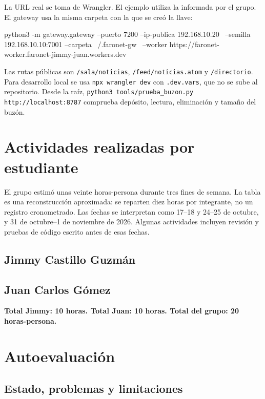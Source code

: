 \documentclass[11pt,letterpaper]{article}
\begin{document}
La URL real se toma de Wrangler. El ejemplo utiliza la informada por el grupo.
El gateway usa la misma carpeta con la que se creó la llave:

\begin{codigo}
python3 -m gateway.gateway --puerto 7200 --ip-publica 192.168.10.20 \
  --semilla 192.168.10.10:7001 --carpeta ~/.faronet-gw \
  --worker https://faronet-worker.faronet-jimmy-juan.workers.dev
\end{codigo}

Las rutas públicas son \texttt{/sala/noticias}, \texttt{/feed/noticias.atom}
y \texttt{/directorio}. Para desarrollo local se usa \texttt{npx wrangler dev}
con \texttt{.dev.vars}, que no se sube al repositorio. Desde la raíz,
\texttt{python3 tools/prueba\_buzon.py http://localhost:8787} comprueba depósito,
lectura, eliminación y tamaño del buzón.

\section{Actividades realizadas por estudiante}

El grupo estimó unas veinte horas-persona durante tres fines de semana. La tabla
es una reconstrucción aproximada: se reparten diez horas por integrante, no un
registro cronometrado. Las fechas se interpretan como 17--18 y 24--25 de octubre,
y 31 de octubre--1 de noviembre de 2026. Algunas actividades incluyen revisión
y pruebas de código escrito antes de esas fechas.

\subsection*{Jimmy Castillo Guzmán}

\Needspace{18\baselineskip}
\subsection*{Juan Carlos Gómez}


\textbf{Total Jimmy: 10 horas. Total Juan: 10 horas. Total del grupo: 20 horas-persona.}

\section{Autoevaluación}

\subsection{Estado, problemas y limitaciones}
\end{document}
